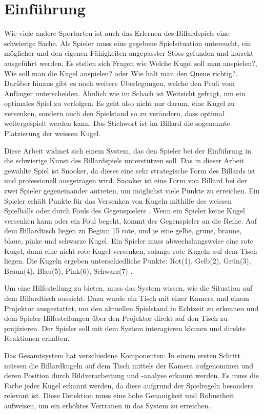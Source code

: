 \chapter{Einführung}\label{kap:introduction}
Wie viele andere Sportarten ist auch das Erlernen des Billardspiels eine schwierige Sache.
Als Spieler muss eine gegebene Spielsituation untersucht, ein möglicher und den eigenen Fähigkeiten angepasster Stoss
gefunden und korrekt ausgeführt werden.
Es stellen sich Fragen wie \glqq Welche Kugel soll man anspielen?\grqq{},
\glqq Wie soll man die Kugel anspielen?\grqq{} oder \glqq Wie hält man den Queue richtig?\grqq{}.
Darüber hinaus gibt es noch weitere Überlegungen, welche den Profi vom Anfänger unterscheiden.
Ähnlich wie im Schach ist Weitsicht gefragt, um ein optimales Spiel zu verfolgen.
Es geht also nicht nur darum, eine Kugel zu versenken, sondern auch den Spielstand so zu verändern,
dass optimal weitergespielt werden kann.
Das Stichwort ist im Billard die sogenannte Platzierung der weissen Kugel.

Diese Arbeit widmet sich einem System, das den Spieler bei der Einführung in die schwierige Kunst des Billardspiels unterstützen soll.
Das in dieser Arbeit gewählte Spiel ist Snooker, da dieses eine sehr strategische Form des Billards ist und professionell ausgetragen wird.
Snooker ist eine Form von Billard bei der zwei Spieler gegeneinander antreten, um möglichst viele Punkte zu erreichen.
Ein Spieler erhält Punkte für das Versenken von Kugeln mithilfe des weissen Spielballs oder durch Fouls des Gegenspielers \cite{stoppball:spielregel:snooker}.
Wenn ein Spieler keine Kugel versenken kann oder ein Foul begeht, kommt der Gegenspieler an die Reihe.
Auf dem Billardtisch liegen zu Beginn 15 rote, und je eine gelbe, grüne, braune, blaue, pinke und schwarze Kugel.
Ein Spieler muss abwechslungsweise eine rote Kugel, dann eine nicht rote Kugel versenken, solange rote Kugeln auf dem Tisch liegen.
Die Kugeln ergeben unterschiedliche Punkte: Rot(1), Gelb(2), Grün(3), Braun(4), Blau(5), Pink(6), Schwarz(7) \cite{stoppball:spielregel:snooker}.

Um eine Hilfestellung zu bieten, muss das System wissen, wie die Situation auf dem Billardtisch aussieht.
Dazu wurde ein Tisch mit einer Kamera und einem Projektor ausgestattet, um den aktuellen Spielstand in Echtzeit
zu erkennen und dem Spieler Hilfestellungen über den Projektor direkt auf den Tisch zu projizieren.
Der Spieler soll mit dem System interagieren können und direkte Reaktionen erhalten.

Das Gesamtsystem hat verschiedene Komponenten: In einem ersten Schritt müssen die Billardkugeln auf dem Tisch mittels der Kamera
aufgenommen und deren Position durch Bildverarbeitung und -analyse erkannt werden.
Es muss die Farbe jeder Kugel erkannt werden, da diese aufgrund der Spielregeln besonders relevant ist.
Diese Detektion muss eine hohe Genauigkeit und Robustheit aufweisen, um ein erhöhtes Vertrauen in das System zu erreichen.

